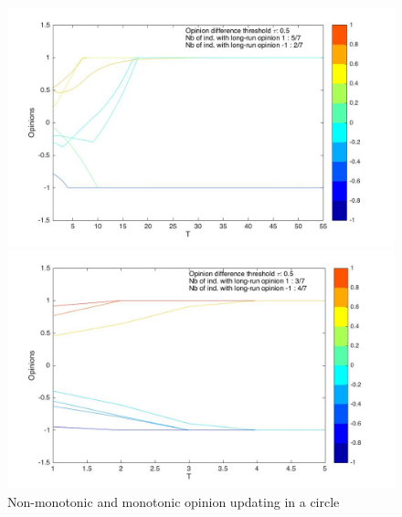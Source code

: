 \documentclass{article}
\begin{document}
\begin{figure}
\centering
  \label{ fig7} 
  \hspace{-1.9cm}
  \begin{minipage}[c]{0.55\textwidth}
    \centering
    \includegraphics[scale=0.22]{img/nm7.jpg} 
  \end{minipage}%
  \begin{minipage}[c]{0.4\textwidth}
    \centering
    \includegraphics[scale=0.22]{img/m7.jpg} 
  \end{minipage} 
  \caption{Non-monotonic and monotonic opinion updating in a circle}
  \label{nonmonotoni6}
  \end{figure}
  
\end{document}
